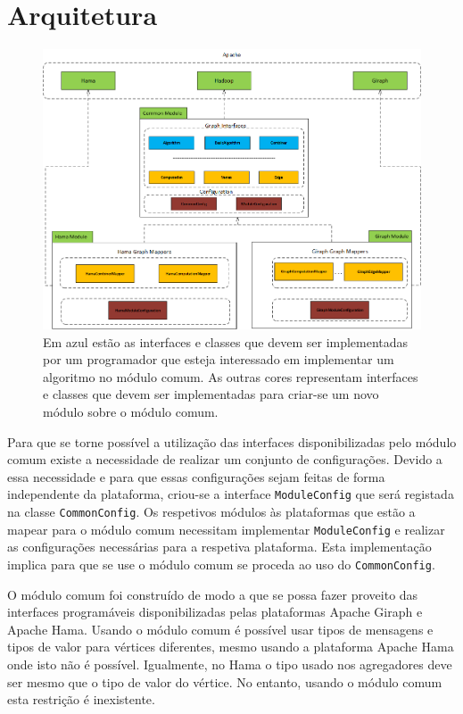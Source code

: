 \chapter{Arquitetura}
\begin{figure}[H]
	\centering
		\includegraphics[width=\linewidth]{arquitetura}
	\caption{Em azul estão as interfaces e classes que devem ser 
	implementadas por um programador que esteja interessado em implementar 
um algoritmo no módulo comum. As outras cores representam interfaces e classes 
que devem ser implementadas para criar-se um novo módulo sobre o módulo comum.}
	\label{fig:arquitetura}
\end{figure}

Para que se torne possível a utilização das interfaces disponibilizadas pelo 
módulo comum existe a necessidade de realizar um conjunto de configurações. 
Devido a essa necessidade e para que essas 
configurações sejam feitas de forma independente da plataforma,
criou-se a interface \texttt{ModuleConfig} que será registada na classe \texttt{CommonConfig}.
Os respetivos módulos às plataformas que estão a mapear para o módulo comum necessitam implementar 
\texttt{ModuleConfig} e realizar as configurações necessárias para a respetiva 
plataforma. Esta implementação implica para que se use o módulo comum se proceda 
ao uso do \texttt{CommonConfig}.

O módulo comum foi construído de modo a que se possa fazer proveito das 
interfaces programáveis disponibilizadas pelas plataformas Apache Giraph e Apache 
Hama. Usando o módulo comum é possível usar tipos de mensagens e tipos de valor 
para vértices diferentes, mesmo usando a plataforma Apache Hama onde isto não é 
possível. Igualmente, no Hama o tipo usado nos agregadores deve ser mesmo que o tipo
de valor do vértice. No entanto, usando o módulo comum esta restrição é inexistente.

